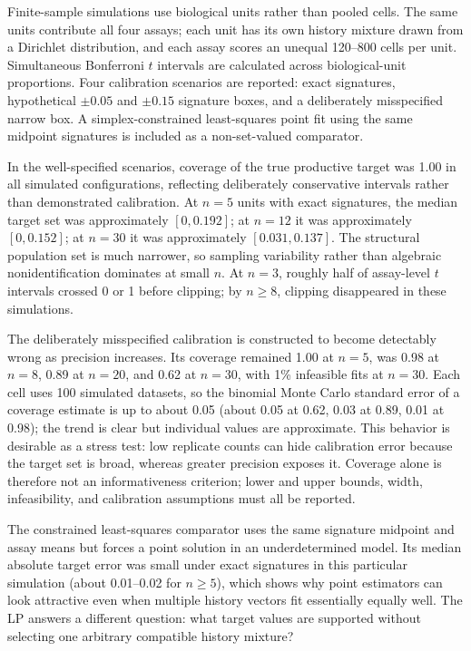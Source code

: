 \documentclass[11pt]{article}
\begin{document}
Finite-sample simulations use biological units rather than pooled cells. The same units contribute all four assays; each unit has its own history mixture drawn from a Dirichlet distribution, and each assay scores an unequal 120--800 cells per unit. Simultaneous Bonferroni $t$ intervals are calculated across biological-unit proportions. Four calibration scenarios are reported: exact signatures, hypothetical $\pm0.05$ and $\pm0.15$ signature boxes, and a deliberately misspecified narrow box. A simplex-constrained least-squares point fit using the same midpoint signatures is included as a non-set-valued comparator.

In the well-specified scenarios, coverage of the true productive target was 1.00 in all simulated configurations, reflecting deliberately conservative intervals rather than demonstrated calibration. At $n=5$ units with exact signatures, the median target set was approximately $[0,0.192]$; at $n=12$ it was approximately $[0,0.152]$; at $n=30$ it was approximately $[0.031,0.137]$. The structural population set is much narrower, so sampling variability rather than algebraic nonidentification dominates at small $n$. At $n=3$, roughly half of assay-level $t$ intervals crossed 0 or 1 before clipping; by $n\ge8$, clipping disappeared in these simulations.

The deliberately misspecified calibration is constructed to become detectably wrong as precision increases. Its coverage remained 1.00 at $n=5$, was 0.98 at $n=8$, 0.89 at $n=20$, and 0.62 at $n=30$, with 1\% infeasible fits at $n=30$. Each cell uses 100 simulated datasets, so the binomial Monte Carlo standard error of a coverage estimate is up to about 0.05 (about 0.05 at 0.62, 0.03 at 0.89, 0.01 at 0.98); the trend is clear but individual values are approximate. This behavior is desirable as a stress test: low replicate counts can hide calibration error because the target set is broad, whereas greater precision exposes it. Coverage alone is therefore not an informativeness criterion; lower and upper bounds, width, infeasibility, and calibration assumptions must all be reported.

The constrained least-squares comparator uses the same signature midpoint and assay means but forces a point solution in an underdetermined model. Its median absolute target error was small under exact signatures in this particular simulation (about 0.01--0.02 for $n\ge5$), which shows why point estimators can look attractive even when multiple history vectors fit essentially equally well. The LP answers a different question: what target values are supported without selecting one arbitrary compatible history mixture?
\end{document}
